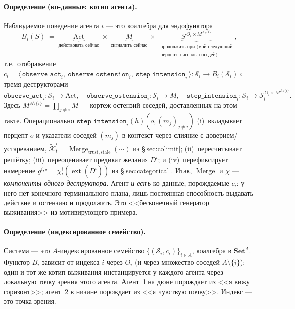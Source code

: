 \documentclass{article}
\newcommand{\method}[1]{\texttt{#1}}
\begin{document}
\paragraph{Определение (ко-данные: котип агента).}
Наблюдаемое поведение агента $i$ --- это коалгебра для эндофунктора
\[
  B_i(S)\;=\;\underbrace{\mathrm{Act}}_{\text{действовать сейчас}}\;\times\;
            \underbrace{M}_{\text{сигналить сейчас}}\;\times\;
            \underbrace{S^{\,O_i\times M^{A\setminus\{i\}}}}_{\substack{\text{продолжить при (мой следующий}\\ \text{перцепт, сигналы соседей)}}},
\]
т.е.\ отображение $c_i=\big\langle\, \method{observe\_act}_i,\ \method{observe\_ostension}_i,\ \method{step\_intension}_i \,\big\rangle : \mathcal{S}_i \to B_i(\mathcal{S}_i)$ с тремя деструкторами
\[
  \method{observe\_act}_i:\mathcal{S}_i\to\mathrm{Act},\quad
  \method{observe\_ostension}_i:\mathcal{S}_i\to M,\quad
  \method{step\_intension}_i:\mathcal{S}_i\to \mathcal{S}_i^{\,O_i\times M^{A\setminus\{i\}}} .
\]
Здесь $M^{A\setminus\{i\}}=\prod_{j\neq i}M$ --- кортеж остензий соседей,
доставленных на этом такте. Операционально
$\method{step\_intension}_i(h)(o,(m_j)_{j\neq i})$
(i)~вкладывает перцепт $o$ и указатели соседей $(m_j)$ в контекст через
слияние с доверием/устареванием,
$\widetilde{\mathcal K}_t^i=\operatorname{Merge}_{\mathrm{trust,stale}}(\cdots)$
из \S\ref{sec:colimit}; (ii)~пересчитывает решётку; (iii)~переоценивает
предикат желания $D^i$; и (iv)~перефиксирует намерение
$g^{i,\star}=\chi_t^i(\operatorname{ext}(D^i))$ из \S\ref{sec:categorical}.
Итак, $\operatorname{Merge}$ и $\chi$ --- \emph{компоненты одного
деструктора}. Агент \emph{и есть} ко-данные, порождаемые $c_i$: у него
нет конечного терминального плана, лишь постоянная способность выдавать
действие и остензию и продолжать. Это <<бесконечный генератор
выживания>> из мотивирующего примера.

\paragraph{Определение (индексированное семейство).}
Система --- это $A$-индексированное семейство
$\{(\mathcal{S}_i,c_i)\}_{i\in A}$, коалгебра в $\mathbf{Set}^{A}$.
Функтор $B_i$ зависит от индекса $i$ через $O_i$ (и через множество
соседей $A\setminus\{i\}$): один и тот же котип выживания
инстанцируется у каждого агента через локальную точку зрения этого
агента. Агент~1 на дюне порождает из <<я вижу горизонт>>; агент~2 в
низине порождает из <<я чувствую почву>>. Индекс --- это точка зрения.
\end{document}
